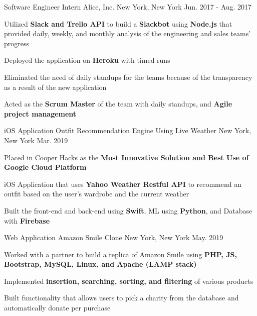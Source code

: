 \begin{cventries}

\cventry
{Software Engineer Intern} %
{Alice, Inc.} %
{New York, New York} %
{Jun. 2017 - Aug. 2017} %
{ %
\begin{cvitems}
\item {Utilized \textbf{Slack and Trello API} to build a \textbf{Slackbot} using \textbf{Node.js} that provided daily, weekly, and monthly analysis of the engineering and sales teams’ progress}
\item {Deployed the application on \textbf{Heroku} with timed runs}
\item {Eliminated the need of daily standups for the teams because of the transparency as a result of the new application}
\item {Acted as the \textbf{Scrum Master} of the team with daily standups, and \textbf{Agile project management}}
\end{cvitems}
}



\cventry
{iOS Application} %
{Outfit Recommendation Engine Using Live Weather} %
{New York, New York} %
{Mar. 2019} %
{ %
\begin{cvitems}
\item {Placed in Cooper Hacks as the \textbf{Most Innovative Solution and Best Use of Google Cloud Platform}}
\item {iOS Application that uses \textbf{Yahoo Weather Restful API} to recommend an outfit based on the user's wardrobe and the current weather}
\item {Built the front-end and back-end using \textbf{Swift}, ML using \textbf{Python}, and Database with \textbf{Firebase}}
\end{cvitems}
}

\cventry
{Web Application} %
{Amazon Smile Clone} %
{New York, New York} %
{May. 2019} %
{ %
\begin{cvitems}
\item {Worked with a partner to build a replica of Amazon Smile using \textbf{PHP, JS, Bootstrap, MySQL, Linux, and Apache (LAMP stack)}}
\item {Implemented \textbf{insertion, searching, sorting, and filtering} of various products}
\item {Built functionality that allows users to pick a charity from the database and automatically donate per purchase}
\end{cvitems}
}

\end{cventries}
